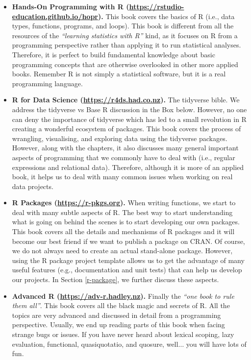 \documentclass[
  11pt,
]{book}
\begin{document}
\begin{itemize}
\item
  \textbf{Hands-On Programming with R (\url{https://rstudio-education.github.io/hopr}).} This book covers the basics of R (i.e., data types, functions, programs, and loops). This book is different from all the resources of the \emph{``learning statistics with R''} kind, as it focuses on R from a programming perspective rather than applying it to run statistical analyses. Therefore, it is perfect to build fundamental knowledge about basic programming concepts that are otherwise overlooked in other more applied books. Remember R is not simply a statistical software, but it is a real programming language.
\item
  \textbf{R for Data Science (\url{https://r4ds.had.co.nz}).} The tidyverse bible. We address the tidyverse vs Base R discussion in the Box below. However, no one can deny the importance of tidyverse which has led to a small revolution in R creating a wonderful ecosystem of packages. This book covers the process of wrangling, visualising, and exploring data using the tidyverse packages. However, along with the chapters, it also discusses many general important aspects of programming that we commonly have to deal with (i.e., regular expressions and relational data). Therefore, although it is more of an applied book, it helps us to deal with many common issues when working on real data projects.\\
\item
  \textbf{R Packages (\url{https://r-pkgs.org}).} When writing functions, we start to deal with many subtle aspects of R. The best way to start understanding what is going on behind the scenes is to start developing our own packages. This book covers all the details and mechanisms of R packages and it will become our best friend if we want to publish a package on CRAN. Of course, we do not always need to create an actual stand-alone package. However, using the R package project template allows us to get the advantage of many useful features (e.g., documentation and unit tests) that can help us develop our projects. In Section \ref{r-package}, we further discuss these aspects.
\item
  \textbf{Advanced R (\url{https://adv-r.hadley.nz}).} Finally the \emph{``one book to rule them all''}. This book covers all the black magic and secrets of R. All the topics are very advanced and discussed in detail from a programming perspective. Usually, we end up reading parts of this book when facing strange bugs or issues. If you have never heard about lexical scoping, lazy evaluation, functional, quasiquotatio, and quosure, well\(\ldots\) you will have lots of fun.
\end{itemize}
\end{document}
